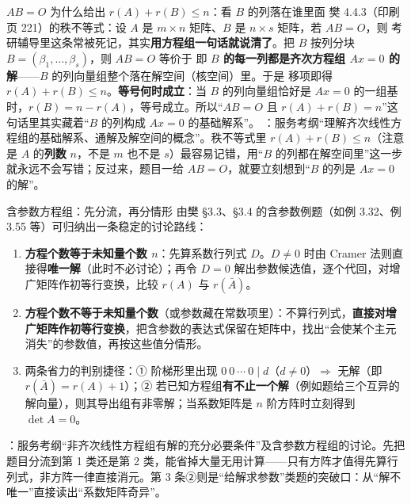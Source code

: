 \begin{fdeep}{$AB=O$ 为什么给出 $r(A)+r(B)\le n$：看 $B$ 的列落在谁里面}
樊 4.4.3（印刷页 221）的秩不等式：设 $A$ 是 $m\times n$ 矩阵、$B$ 是 $n\times s$ 矩阵，若 $AB=O$，则
考研辅导里这条常被死记，其实\textbf{用方程组一句话就说清了}。把 $B$ 按列分块 $B=(\beta_1,\dots,\beta_s)$，则 $AB=O$ 等价于
即 \textbf{$B$ 的每一列都是齐次方程组 $Ax=0$ 的解}——$B$ 的列向量组整个落在解空间（核空间）里。于是
移项即得 $r(A)+r(B)\le n$。\textbf{等号何时成立}：当 $B$ 的列向量组恰好是 $Ax=0$ 的一组基时，$r(B)=n-r(A)$，等号成立。所以“$AB=O$ 且 $r(A)+r(B)=n$”这句话里其实藏着“$B$ 的列构成 $Ax=0$ 的基础解系”。
\fbref{}：服务考纲“理解齐次线性方程组的基础解系、通解及解空间的概念”。秩不等式里 $r(A)+r(B)\le n$（注意是 $A$ 的\textbf{列数} $n$，不是 $m$ 也不是 $s$）最容易记错，用“$B$ 的列都在解空间里”这一步就永远不会写错；反过来，题目一给 $AB=O$，就要立刻想到“$B$ 的列是 $Ax=0$ 的解”。
\end{fdeep}

\begin{fdeep}{含参数方程组：先分流，再分情形}
由樊 §3.3、§3.4 的含参数例题（如例 3.32、例 3.55 等）可归纳出一条稳定的讨论路线：
\begin{enumerate}[leftmargin=2.2em,itemsep=0.25em]
\item \textbf{方程个数等于未知量个数 $n$}：先算系数行列式 $D$。$D\ne0$ 时由 Cramer 法则直接得\textbf{唯一解}（此时不必讨论）；再令 $D=0$ 解出参数候选值，逐个代回，对增广矩阵作初等行变换，比较 $r(A)$ 与 $r(\bar A)$。
\item \textbf{方程个数不等于未知量个数}（或参数藏在常数项里）：不算行列式，\textbf{直接对增广矩阵作初等行变换}，把含参数的表达式保留在矩阵中，找出“会使某个主元消失”的参数值，再按这些值分情形。
\item 两条省力的判别捷径：① 阶梯形里出现 $0\ 0\ \cdots\ 0\mid d$（$d\ne0$）$\Longrightarrow$ 无解（即 $r(\bar A)=r(A)+1$）；② 若已知方程组\textbf{有不止一个解}（例如题给三个互异的解向量），则其导出组有非零解；当系数矩阵是 $n$ 阶方阵时立刻得到 $\det A=0$。
\end{enumerate}
\fbref{}：服务考纲“非齐次线性方程组有解的充分必要条件”及含参数方程组的讨论。先把题目分流到第 1 类还是第 2 类，能省掉大量无用计算——只有方阵才值得先算行列式，非方阵一律直接消元。第 3 条②则是“给解求参数”类题的突破口：从“解不唯一”直接读出“系数矩阵奇异”。
\end{fdeep}

